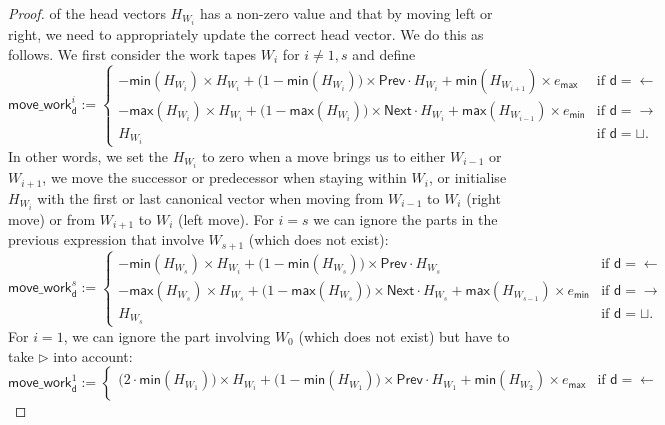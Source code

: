 \begin{proof}
    of the head vectors $H_{W_i}$ has a non-zero value and that by moving left or right, we need to 
    appropriately update the correct head vector. We do this as follows. We first consider the work tapes 
    $W_i$ for $i\neq 1,s$ and define
    $$
    \mathsf{move\_work}^i_{\mathsf{d}}:=
    \begin{cases}
        -\mathsf{min}(H_{W_i})\times H_{W_i} + \bigl(1-\mathsf{min}(H_{W_i})\bigr)\times \mathsf{Prev}\cdot H_{W_i} + \mathsf{min}(H_{W_{i+1}})\times e_{\mathsf{max}} & \!\!\!\!\text{if $\mathsf{d}=\leftarrow$}\\
            -\mathsf{max}(H_{W_i})\times H_{W_i} + \bigl(1-\mathsf{max}(H_{W_i})\bigr)\times \mathsf{Next}\cdot H_{W_i} + \mathsf{max}(H_{W_{i-1}})\times e_{\mathsf{min}} &\!\!\!\! \text{if $\mathsf{d}=\rightarrow$}\\
        H_{W_i} &\!\!\!\! \text{if $\mathsf{d}=\sqcup$}. 	
    \end{cases}
    $$
    In other words, we set the $H_{W_i}$ to zero when a move brings us to either $W_{i-1}$ or $W_{i+1}$, we
    move the successor or predecessor when staying within $W_i$, or initialise $H_{W_i}$ with the first or 
    last canonical vector when moving from $W_{i-1}$ to $W_i$ (right move) or from $W_{i+1}$ to $W_i$ (left move).
    For $i=s$ we can ignore the parts in the previous expression that involve $W_{s+1}$ (which does not exist):
    $$
    \mathsf{move\_work}^s_{\mathsf{d}}:=
    \begin{cases}
        -\mathsf{min}(H_{W_s})\times H_{W_i} + \bigl(1-\mathsf{min}(H_{W_s})\bigr)\times \mathsf{Prev}\cdot H_{W_s}  &\!\!\!\! \text{if $\mathsf{d}=\leftarrow$}\\
            -\mathsf{max}(H_{W_s}) \times H_{W_s} + \bigl(1-\mathsf{max}(H_{W_s})\bigr)\times \mathsf{Next}\cdot H_{W_s} + \mathsf{max}(H_{W_{s-1}})\times e_{\mathsf{min}} & \!\!\!\!\text{if $\mathsf{d}=\rightarrow$}\\
        H_{W_s} & \!\!\!\!\text{if $\mathsf{d}=\sqcup$}. 	
    \end{cases}
    $$
    For $i=1$, we can ignore the part involving $W_{0}$ (which does not exist) but have to take $\rhd$ 
    into account:
    $$
    \mathsf{move\_work}^1_{\mathsf{d}}:=
    \begin{cases}
        \bigl(2\cdot \mathsf{min}(H_{W_1})\bigr)\times H_{W_i} + \bigl(1-\mathsf{min}(H_{W_1})\bigr)\times \mathsf{Prev}\cdot H_{W_1} + \mathsf{min}(H_{W_{2}})\times e_{\mathsf{max}} & \!\!\!\!\text{if $\mathsf{d}=\leftarrow$}\\

\end{cases}$$
\end{proof}
